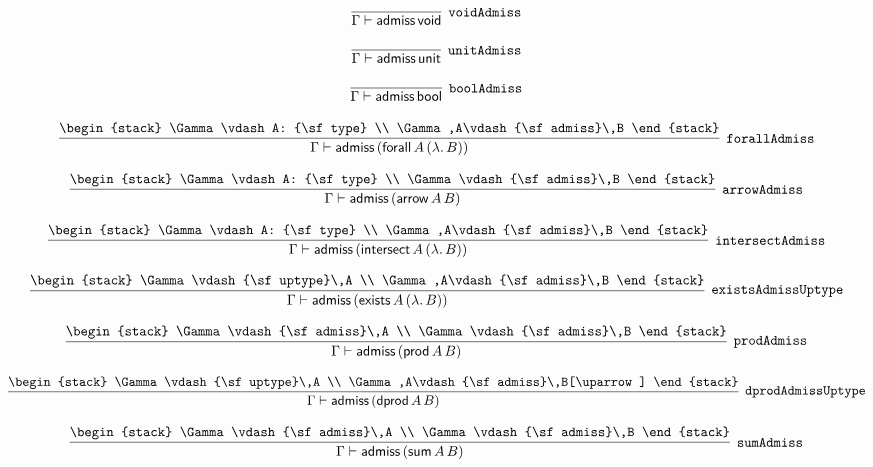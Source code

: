\[
\infer[{\tt voidAdmiss}]{\Gamma \vdash {\sf admiss}\,{\sf void}}{}
\]

\[
\infer[{\tt unitAdmiss}]{\Gamma \vdash {\sf admiss}\,{\sf unit}}{}
\]

\[
\infer[{\tt boolAdmiss}]{\Gamma \vdash {\sf admiss}\,{\sf bool}}{}
\]

\[
\infer[{\tt forallAdmiss}]{\Gamma \vdash {\sf admiss}\,({\sf forall}\,A\,(\lambda .\,B))}{
\begin{stack}
\Gamma \vdash A: {\sf type}
\\
\Gamma ,A\vdash {\sf admiss}\,B
\end{stack}}
\]

\[
\infer[{\tt arrowAdmiss}]{\Gamma \vdash {\sf admiss}\,({\sf arrow}\,A\,B)}{
\begin{stack}
\Gamma \vdash A: {\sf type}
\\
\Gamma \vdash {\sf admiss}\,B
\end{stack}}
\]

\[
\infer[{\tt intersectAdmiss}]{\Gamma \vdash {\sf admiss}\,({\sf intersect}\,A\,(\lambda .\,B))}{
\begin{stack}
\Gamma \vdash A: {\sf type}
\\
\Gamma ,A\vdash {\sf admiss}\,B
\end{stack}}
\]

\[
\infer[{\tt existsAdmissUptype}]{\Gamma \vdash {\sf admiss}\,({\sf exists}\,A\,(\lambda .\,B))}{
\begin{stack}
\Gamma \vdash {\sf uptype}\,A
\\
\Gamma ,A\vdash {\sf admiss}\,B
\end{stack}}
\]

\[
\infer[{\tt prodAdmiss}]{\Gamma \vdash {\sf admiss}\,({\sf prod}\,A\,B)}{
\begin{stack}
\Gamma \vdash {\sf admiss}\,A
\\
\Gamma \vdash {\sf admiss}\,B
\end{stack}}
\]

\[
\infer[{\tt dprodAdmissUptype}]{\Gamma \vdash {\sf admiss}\,({\sf dprod}\,A\,B)}{
\begin{stack}
\Gamma \vdash {\sf uptype}\,A
\\
\Gamma ,A\vdash {\sf admiss}\,B[\uparrow ]
\end{stack}}
\]

\[
\infer[{\tt sumAdmiss}]{\Gamma \vdash {\sf admiss}\,({\sf sum}\,A\,B)}{
\begin{stack}
\Gamma \vdash {\sf admiss}\,A
\\
\Gamma \vdash {\sf admiss}\,B
\end{stack}}
\]

